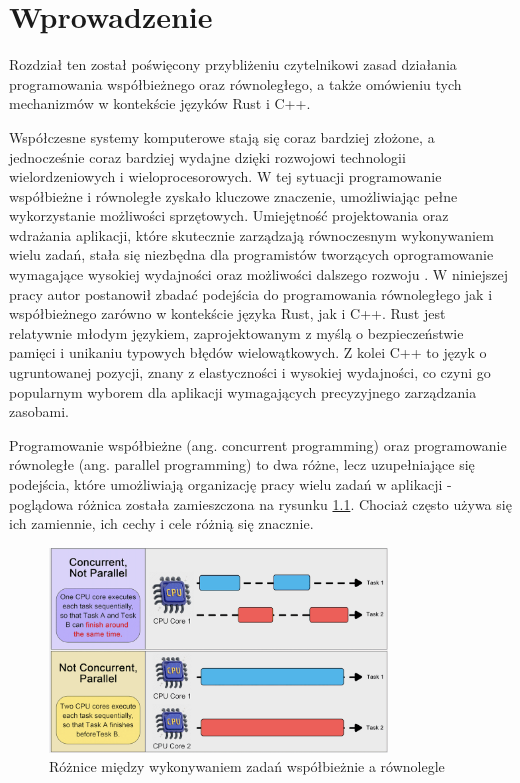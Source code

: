\chapter{Wprowadzenie}
Rozdział ten został poświęcony przybliżeniu czytelnikowi zasad działania programowania współbieżnego oraz równoległego, a także omówieniu tych mechanizmów w kontekście języków Rust i C++.

Współczesne systemy komputerowe stają się coraz bardziej złożone, a jednocześnie coraz bardziej wydajne dzięki rozwojowi technologii wielordzeniowych i wieloprocesorowych. W tej sytuacji programowanie współbieżne i równoległe zyskało kluczowe znaczenie, umożliwiając pełne wykorzystanie możliwości sprzętowych. Umiejętność projektowania oraz wdrażania aplikacji, które skutecznie zarządzają równoczesnym wykonywaniem wielu zadań, stała się niezbędna dla programistów tworzących oprogramowanie wymagające wysokiej wydajności oraz możliwości dalszego rozwoju \cite{IntroductionToConcurrencyAndParallelism, ConcurrencyInAction, ProgramminInOpenMp, ParallelProgramminginC++withOpenMP}. W niniejszej pracy autor postanowił zbadać podejścia do programowania równoległego jak i współbieżnego zarówno w kontekście języka Rust, jak i C++. Rust jest relatywnie młodym językiem, zaprojektowanym z myślą o bezpieczeństwie pamięci i unikaniu typowych błędów wielowątkowych. Z kolei C++ to język o ugruntowanej pozycji, znany z elastyczności i wysokiej wydajności, co czyni go popularnym wyborem dla aplikacji wymagających precyzyjnego zarządzania zasobami.

Programowanie współbieżne (ang. concurrent programming) oraz programowanie równoległe (ang. parallel programming) to dwa różne, lecz uzupełniające się podejścia, które umożliwiają organizację pracy wielu zadań w aplikacji - poglądowa różnica została zamieszczona na rysunku \ref{fig:concurrent_vs_parallel}. Chociaż często używa się ich zamiennie, ich cechy i cele różnią się znacznie.

\begin{figure}[H]
    \centering
    \includegraphics[width=0.8\textwidth]{images/ConcurrentParallelCompare.png}
    \caption{Różnice między wykonywaniem zadań współbieżnie a równolegle \cite{bytebytegoEP108Design}}
    \label{fig:concurrent_vs_parallel}
\end{figure}

